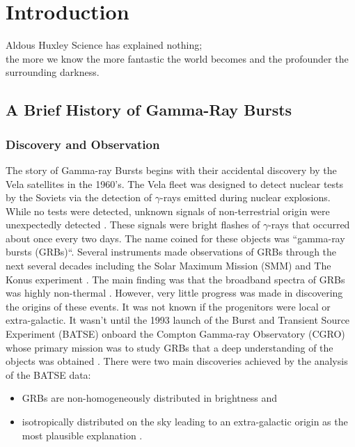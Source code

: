 \chapter{Introduction}
\label{ch:intro}

\begin{chapterquote}{Aldous Huxley}
  Science has explained nothing; \\the more we know the more fantastic
  the world becomes and the profounder the surrounding darkness.
\end{chapterquote}

\section{A Brief History of Gamma-Ray Bursts}

\subsection{Discovery and Observation}
The story of Gamma-ray Bursts begins with their accidental discovery
by the Vela satellites in the 1960's. The Vela fleet was designed to
detect nuclear tests by the Soviets via the detection of $\gamma$-rays
emitted during nuclear explosions. While no tests were detected,
unknown signals of non-terrestrial origin were unexpectedly detected
\cite{Klebesadel:1973}. These signals were bright flashes of
$\gamma$-rays that occurred about once every two days. The name coined
for these objects was ``gamma-ray bursts (GRBs)``. Several instruments
made observations of GRBs through the next several decades including
the Solar Maximum Mission (SMM) and The Konus experiment
\cite{1986AdSpR...6..191K,1984BAAS...16..447N,1982ans..conf..229R,1981Ap&SS..80...85M,1979KosIs..17..812M}. The
main finding was that the broadband spectra of GRBs was highly
non-thermal \cite{Fenimore:1982,matz,Mazets:1981}. However, very
little progress was made in discovering the origins of these
events. It was not known if the progenitors were local or
extra-galactic. It wasn't until the 1993 launch of the Burst and
Transient Source Experiment (BATSE) onboard the Compton Gamma-ray
Observatory (CGRO) whose primary mission was to study GRBs that a deep
understanding of the objects was obtained \cite{Fishman:1995}. There
were two main discoveries achieved by the analysis of the BATSE data:
\begin{itemize}
\item GRBs are non-homogeneously distributed in brightness and
\item isotropically distributed on the sky leading to an
  extra-galactic origin as the most plausible explanation
  \cite{Fenimore:1993}.
\end{itemize}

